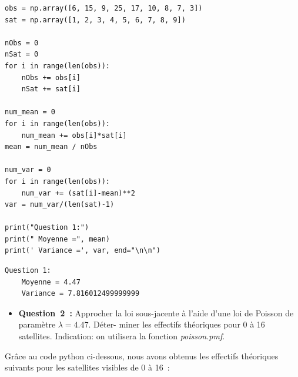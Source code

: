 \begin{lstlisting}[style=myPython, caption=Code Python question 1, frame=lines]
obs = np.array([6, 15, 9, 25, 17, 10, 8, 7, 3])
sat = np.array([1, 2, 3, 4, 5, 6, 7, 8, 9])

nObs = 0
nSat = 0
for i in range(len(obs)):
    nObs += obs[i]
    nSat += sat[i]

num_mean = 0
for i in range(len(obs)):
    num_mean += obs[i]*sat[i]
mean = num_mean / nObs

num_var = 0
for i in range(len(obs)):
    num_var += (sat[i]-mean)**2
var = num_var/(len(sat)-1)

print("Question 1:")
print(" Moyenne =", mean)
print(' Variance =', var, end="\n\n")    
\end{lstlisting}

\begin{lstlisting}[style=myLog, caption=Résultat du code, frame=lines]
Question 1:
    Moyenne = 4.47
    Variance = 7.816012499999999
\end{lstlisting}

\vspace{.5cm}
\begin{itemize}[label={},itemindent=-2em,leftmargin=2em]
    \item \textbf{Question~2~:} Approcher la loi sous-jacente à l’aide d’une loi de Poisson de paramètre $\lambda = 4.47$. Déter-
    miner les effectifs théoriques pour 0 à 16 satellites. Indication: on utilisera la fonction \textit{poisson.pmf}.
\end{itemize}
\vspace{.2cm}

Grâce au code python ci-dessous, nous avons obtenus les effectifs théoriques suivants pour les satellites visibles de 0 à 16~:

\vspace{.1cm}


